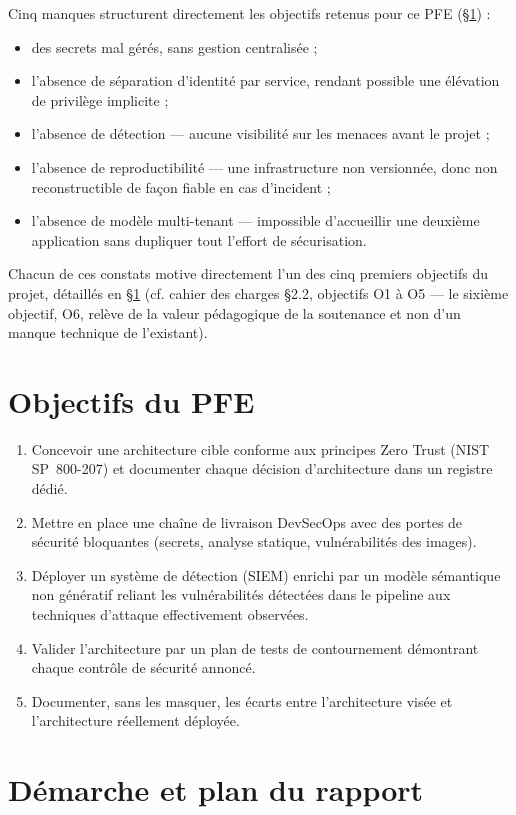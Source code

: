Cinq manques structurent directement les objectifs retenus pour ce PFE (§\ref{sec:objectifs}) :

\begin{itemize}
  \item des secrets mal gérés, sans gestion centralisée ;
  \item l'absence de séparation d'identité par service, rendant possible une élévation de
        privilège implicite ;
  \item l'absence de détection --- aucune visibilité sur les menaces avant le projet ;
  \item l'absence de reproductibilité --- une infrastructure non versionnée, donc non
        reconstructible de façon fiable en cas d'incident ;
  \item l'absence de modèle multi-tenant --- impossible d'accueillir une deuxième application
        sans dupliquer tout l'effort de sécurisation.
\end{itemize}

Chacun de ces constats motive directement l'un des cinq premiers objectifs du projet, détaillés
en §\ref{sec:objectifs} (cf. cahier des charges §2.2, objectifs O1 à O5 --- le sixième
objectif, O6, relève de la valeur pédagogique de la soutenance et non d'un manque technique de
l'existant).

\section{Objectifs du PFE}
\label{sec:objectifs}

\begin{enumerate}
  \item Concevoir une architecture cible conforme aux principes Zero Trust (NIST
        SP~800-207) et documenter chaque décision d'architecture dans un registre dédié.
  \item Mettre en place une chaîne de livraison DevSecOps avec des portes de sécurité
        bloquantes (secrets, analyse statique, vulnérabilités des images).
  \item Déployer un système de détection (SIEM) enrichi par un modèle sémantique non
        génératif reliant les vulnérabilités détectées dans le pipeline aux techniques
        d'attaque effectivement observées.
  \item Valider l'architecture par un plan de tests de contournement démontrant chaque
        contrôle de sécurité annoncé.
  \item Documenter, sans les masquer, les écarts entre l'architecture visée et
        l'architecture réellement déployée.
\end{enumerate}

\section{Démarche et plan du rapport}

